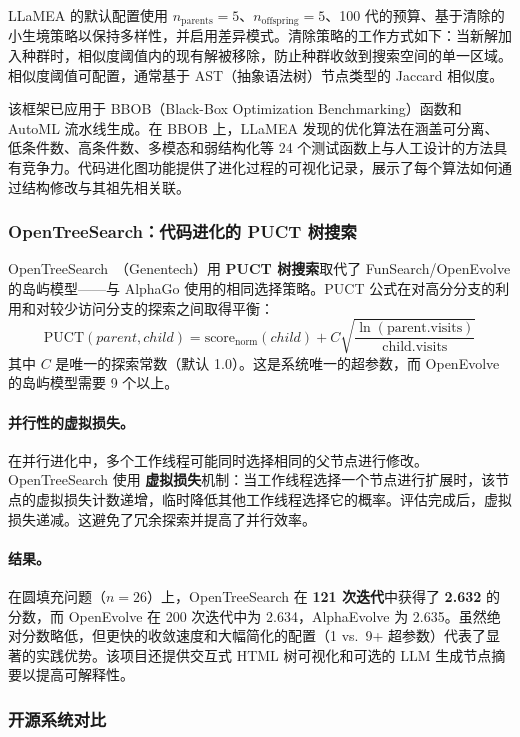 LLaMEA 的默认配置使用 $n_{\text{parents}}=5$、$n_{\text{offspring}}=5$、100 代的预算、基于清除的小生境策略以保持多样性，并启用差异模式。清除策略的工作方式如下：当新解加入种群时，相似度阈值内的现有解被移除，防止种群收敛到搜索空间的单一区域。相似度阈值可配置，通常基于 AST（抽象语法树）节点类型的 Jaccard 相似度。

该框架已应用于 BBOB（Black-Box Optimization Benchmarking）函数和 AutoML 流水线生成。在 BBOB 上，LLaMEA 发现的优化算法在涵盖可分离、低条件数、高条件数、多模态和弱结构化等 24 个测试函数上与人工设计的方法具有竞争力。代码进化图功能提供了进化过程的可视化记录，展示了每个算法如何通过结构修改与其祖先相关联。


\subsubsection{OpenTreeSearch：代码进化的 PUCT 树搜索}

OpenTreeSearch~\citep{genentech2025opentreesearch}（Genentech）用 \textbf{PUCT 树搜索}取代了 FunSearch/OpenEvolve 的岛屿模型——与 AlphaGo 使用的相同选择策略。PUCT 公式在对高分分支的利用和对较少访问分支的探索之间取得平衡：
\begin{equation}
\text{PUCT}(parent, child) = \text{score}_{\text{norm}}(child) + C\sqrt{\frac{\ln(\text{parent.visits})}{\text{child.visits}}}
\end{equation}
其中 $C$ 是唯一的探索常数（默认 1.0）。这是系统唯一的超参数，而 OpenEvolve 的岛屿模型需要 9 个以上。

\paragraph{并行性的虚拟损失。}
在并行进化中，多个工作线程可能同时选择相同的父节点进行修改。OpenTreeSearch 使用 \textbf{虚拟损失}机制：当工作线程选择一个节点进行扩展时，该节点的虚拟损失计数递增，临时降低其他工作线程选择它的概率。评估完成后，虚拟损失递减。这避免了冗余探索并提高了并行效率。

\paragraph{结果。}
在圆填充问题（$n=26$）上，OpenTreeSearch 在 \textbf{121 次迭代}中获得了 \textbf{2.632} 的分数，而 OpenEvolve 在 200 次迭代中为 2.634，AlphaEvolve 为 2.635。虽然绝对分数略低，但更快的收敛速度和大幅简化的配置（1 vs.\ 9+ 超参数）代表了显著的实践优势。该项目还提供交互式 HTML 树可视化和可选的 LLM 生成节点摘要以提高可解释性。


\subsubsection{开源系统对比}

